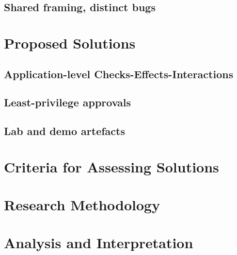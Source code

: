 \documentclass[peerreview]{IEEEtran}
\begin{document}
\subsection{Shared framing, distinct bugs}

\section{Proposed Solutions}
\subsection{Application-level Checks-Effects-Interactions}

\subsection{Least-privilege approvals}

\subsection{Lab and demo artefacts}

\section{Criteria for Assessing Solutions}\label{sec:criteria}

\section{Research Methodology}

\section{Analysis and Interpretation}
\end{document}
